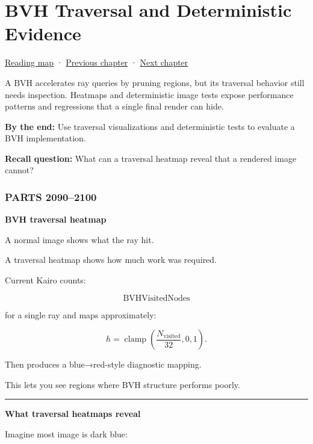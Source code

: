 \hypertarget{03-visual-computing-i-ch011}{}
\chapter{BVH Traversal and Deterministic Evidence}\label{03-visual-computing-i-ch011-bvh-traversal-and-deterministic-evidence}

\hyperref[volume-reading-map]{Reading map} · \hyperref[03-visual-computing-i-ch010-a-production-path-tracer-media-randomness-and-validation]{Previous chapter} · \hyperref[03-visual-computing-i-ch012-probability-statistics-and-uncertainty]{Next chapter}

A BVH accelerates ray queries by pruning regions, but its traversal behavior still needs inspection. Heatmaps and deterministic image tests expose performance patterns and regressions that a single final render can hide.

\textbf{By the end:} Use traversal visualizations and deterministic tests to evaluate a BVH implementation.

\textbf{Recall question:} What can a traversal heatmap reveal that a rendered image cannot?

\subsection{PARTS 2090--2100}\label{03-visual-computing-i-ch011-parts-20902100}

\textbf{BVH traversal heatmap}

A normal image shows what the ray hit.

A traversal heatmap shows how much work was required.

Current Kairo counts:

\[
\text{BVHVisitedNodes}
\]

for a single ray and maps approximately:

\[
h=
\operatorname{clamp}
\left(
\frac{
N_{\text{visited}}
}{
32
},
0,1
\right).
\]

Then produces a blue→red-style diagnostic mapping.

This lets you see regions where BVH structure performs poorly.

\begin{center}\rule{0.5\linewidth}{0.5pt}\end{center}

\textbf{What traversal heatmaps reveal}

Imagine most image is dark blue:

